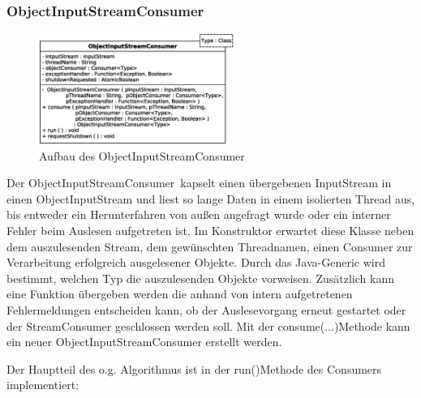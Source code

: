 \vspace{-2px}
\subsubsection{ObjectInputStreamConsumer} \label{sec:ObjectInputStreamConsumer}
\vspace{-2px}
\begin{figure}
	\vspace{-23px} \hspace{5px}
	\includegraphics[width=240px]{../img/CD-ObjectInputStreamConsumer.eps}
	\caption{Aufbau des \glqq ObjectInputStreamConsumer\grqq}
\end{figure}
\par Der \glqq ObjectInputStreamConsumer\grqq\ kapselt einen übergebenen InputStream in einen ObjectInputStream und liest so lange Daten in einem isolierten Thread aus, bis entweder ein Herunterfahren von außen angefragt wurde oder ein interner Fehler beim Auslesen aufgetreten ist. Im Konstruktor erwartet diese Klasse neben dem auszulesenden Stream, dem gewünschten Threadnamen, einen Consumer zur Verarbeitung erfolgreich ausgelesener Objekte. Durch das Java-Generic wird bestimmt, welchen Typ die auszulesenden Objekte vorweisen. Zusätzlich kann eine Funktion übergeben werden die anhand von intern aufgetretenen Fehlermeldungen entscheiden kann, ob der Auslesevorgang erneut gestartet oder der StreamConsumer geschlossen werden soll. Mit der \glqq consume(...)\grqq\-Methode kann ein neuer ObjectInputStreamConsumer erstellt werden.
\par Der Hauptteil des o.g. Algorithmus ist in der \glqq run()\grqq\-Methode des Consumers implementiert:
\vspace{-5px}
